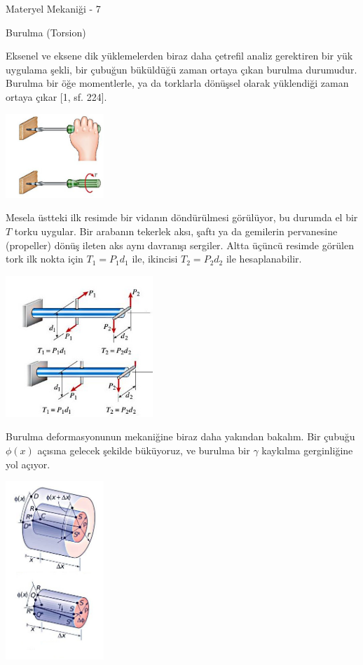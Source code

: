 \documentclass[12pt,fleqn]{article}\usepackage{../../common}
\begin{document}
Materyel Mekaniği - 7

Burulma (Torsion)

Eksenel ve eksene dik yüklemelerden biraz daha çetrefil analiz gerektiren bir
yük uygulama şekli, bir çubuğun büküldüğü zaman ortaya çıkan burulma durumudur.
Burulma bir öğe momentlerle, ya da torklarla dönüşsel olarak yüklendiği zaman
ortaya çıkar [1, sf. 224].

\includegraphics[width=10em]{phy_020_strs_06_01.jpg}

Mesela üstteki ilk resimde bir vidanın döndürülmesi görülüyor, bu durumda el bir
$T$ torku uygular. Bir arabanın tekerlek aksı, şaftı ya da gemilerin pervanesine
(propeller) dönüş ileten aks aynı davranışı sergiler.  Altta üçüncü resimde
görülen tork ilk nokta için $T_1 = P_1 d_1$ ile, ikincisi $T_2 = P_2 d_2$ ile
hesaplanabilir.

\includegraphics[width=15em]{phy_020_strs_06_02.jpg}

Burulma deformasyonunun mekaniğine biraz daha yakından bakalım. Bir çubuğu
$\phi(x)$ açısına gelecek şekilde büküyoruz, ve burulma bir $\gamma$ kaykılma
gerginliğine yol açıyor.

\includegraphics[width=10em]{phy_020_strs_06_03.jpg}
\end{document}
